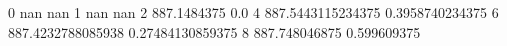 0 nan nan
1 nan nan
2 887.1484375 0.0
4 887.5443115234375 0.3958740234375
6 887.4232788085938 0.27484130859375
8 887.748046875 0.599609375
